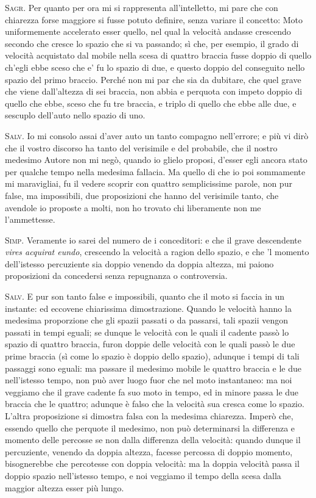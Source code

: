 \documentclass[11pt,twoside,openany]{book}
\newcommand{\speaker}[1]{\textcolor{rubric}{\textsc{#1}}\space}
\begin{document}
\speaker{Sagr.} Per quanto per ora mi si rappresenta all'intelletto, mi pare che con chiarezza forse maggiore si fusse potuto definire, senza variare il concetto: Moto uniformemente accelerato esser quello, nel qual la velocità andasse crescendo secondo che cresce lo spazio che si va passando; sì che, per esempio, il grado di velocità acquistato dal mobile nella scesa di quattro braccia fusse doppio di quello ch'egli ebbe sceso che e' fu lo spazio di due, e questo doppio del conseguito nello spazio del primo braccio. Perché non mi par che sia da dubitare, che quel grave che viene dall'altezza di sei braccia, non abbia e perquota con impeto doppio di quello che ebbe, sceso che fu tre braccia, e triplo di quello che ebbe alle due, e sescuplo dell'auto nello spazio di uno.

\speaker{Salv.} Io mi consolo assai d'aver auto un tanto compagno nell'errore; e più vi dirò che il vostro discorso ha tanto del verisimile e del probabile, che il nostro medesimo Autore non mi negò, quando io glielo proposi, d'esser egli ancora stato per qualche tempo nella medesima fallacia. Ma quello di che io poi sommamente mi maravigliai, fu il vedere scoprir con quattro semplicissime parole, non pur false, ma impossibili, due proposizioni che hanno del verisimile tanto, che avendole io proposte a molti, non ho trovato chi liberamente non me l'ammettesse.

\speaker{Simp.} Veramente io sarei del numero de i conceditori: e che il grave descendente \emph{vires acquirat eundo}, crescendo la velocità a ragion dello spazio, e che 'l momento dell'istesso percuziente sia doppio venendo da doppia altezza, mi paiono proposizioni da concedersi senza repugnanza o controversia.

\speaker{Salv.} E pur son tanto false e impossibili, quanto che il moto si faccia in un instante: ed eccovene chiarissima dimostrazione. Quando le velocità hanno la medesima proporzione che gli spazii passati o da passarsi, tali spazii vengon passati in tempi eguali; se dunque le velocità con le quali il cadente passò lo spazio di quattro braccia, furon doppie delle velocità con le quali passò le due prime braccia (sì come lo spazio è doppio dello spazio), adunque i tempi di tali passaggi sono eguali: ma passare il medesimo mobile le quattro braccia e le due nell'istesso tempo, non può aver luogo fuor che nel moto instantaneo: ma noi veggiamo che il grave cadente fa suo moto in tempo, ed in minore passa le due braccia che le quattro; adunque è falso che la velocità sua cresca come lo spazio. L'altra proposizione si dimostra falsa con la medesima chiarezza. Imperò che, essendo quello che perquote il medesimo, non può determinarsi la differenza e momento delle percosse se non dalla differenza della velocità: quando dunque il percuziente, venendo da doppia altezza, facesse percossa di doppio momento, bisognerebbe che percotesse con doppia velocità: ma la doppia velocità passa il doppio spazio nell'istesso tempo, e noi veggiamo il tempo della scesa dalla maggior altezza esser più lungo.
\end{document}
